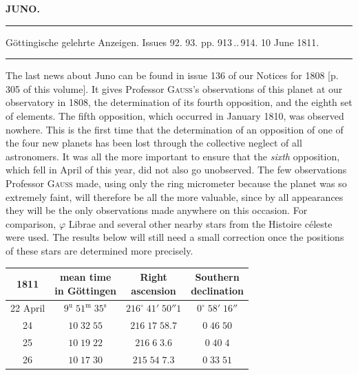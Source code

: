 \clearpage{}\hypertarget{native-330-lower}{}\label{native-330-lower}
\begin{center}\textbf{JUNO.}\par\vspace{4pt}\hrule\vspace{4pt}\fontsize{10}{12}\selectfont Göttingische gelehrte Anzeigen. Issues 92. 93. pp. 913\,..\,914. 10 June 1811.\par\vspace{4pt}\hrule\vspace{4pt}\end{center}

\par\indent The last news about Juno can be found in issue 136 of our Notices for 1808 [p. 305 of this volume]. It gives Professor \textsc{Gauss}’s observations of this planet at our observatory in 1808, the determination of its fourth opposition, and the eighth set of elements. The fifth opposition, which occurred in January 1810, was observed nowhere. This is the first time that the determination of an opposition of one of the four new planets has been lost through the collective neglect of all astronomers. It was all the more important to ensure that the \emph{sixth} opposition, which fell in April of this year, did not also go unobserved. The few observations Professor \textsc{Gauss} made, using only the ring micrometer because the planet was so extremely faint, will therefore be all the more valuable, since by all appearances they will be the only observations made anywhere on this occasion. For comparison, $\varphi$ Librae and several other nearby stars from the Histoire céleste were used. The results below will still need a small correction once the positions of these stars are determined more precisely.
\begin{center}\fontsize{10}{12}\selectfont\setlength{\tabcolsep}{4pt}\renewcommand{\arraystretch}{1.15}\begin{tabular}{c|c|c|c}
1811 & \shortstack{mean time\\in Göttingen} & \shortstack{Right\\ascension} & \shortstack{Southern\\declination}\\\hline
22 April & $9^{\text{u}}\;51^{\text{m}}\;35^{\text{s}}$ & $216^\circ\;41'\;50''1$ & $0^\circ\;58'\;16''$\\
24 & $10\;32\;55$ & $216\;17\;58.7$ & $0\;46\;50$\\
25 & $10\;19\;22$ & $216\;6\;3.6$ & $0\;40\;4$\\
26 & $10\;17\;30$ & $215\;54\;7.3$ & $0\;33\;51$\\
\end{tabular}\end{center}

